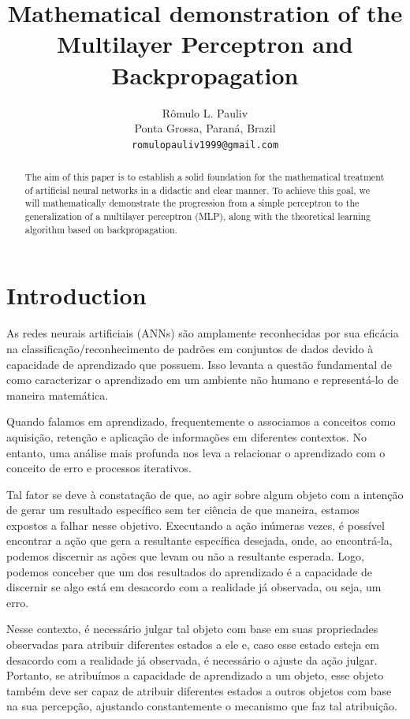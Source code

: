 \documentclass{article}
\title{Mathematical demonstration of the Multilayer Perceptron and Backpropagation}
\author{
 Rômulo L. Pauliv \\
  Ponta Grossa, Paraná, Brazil\\
  \texttt{romulopauliv1999@gmail.com} \\
}
\begin{document}
\maketitle
\begin{abstract}
  The aim of this paper is to establish a solid foundation for the mathematical treatment of artificial neural networks in a didactic and clear manner. To achieve this goal, we will mathematically demonstrate the progression from a simple perceptron to the generalization of a multilayer perceptron (MLP), along with the theoretical learning algorithm based on backpropagation.
\end{abstract}




\section{Introduction}
As redes neurais artificiais (ANNs) são amplamente reconhecidas por sua eficácia na classificação/reconhecimento de padrões em conjuntos de dados devido à capacidade de aprendizado que possuem. Isso levanta a questão fundamental de como caracterizar o aprendizado em um ambiente não humano e representá-lo de maneira matemática.

Quando falamos em aprendizado, frequentemente o associamos a conceitos como aquisição, retenção e aplicação de informações em diferentes contextos. No entanto, uma análise mais profunda nos leva a relacionar o aprendizado com o conceito de erro e processos iterativos. 

Tal fator se deve à constatação de que, ao agir sobre algum objeto com a intenção de gerar um resultado específico sem ter ciência de que maneira, estamos expostos a falhar nesse objetivo. Executando a ação inúmeras vezes, é possível encontrar a ação que gera a resultante específica desejada, onde, ao encontrá-la, podemos discernir as ações que levam ou não a resultante esperada. Logo, podemos conceber que um dos resultados do aprendizado é a capacidade de discernir se algo está em desacordo com a realidade já observada, ou seja, um erro. 

Nesse contexto, é necessário julgar tal objeto com base em suas propriedades observadas para atribuir diferentes estados a ele e, caso esse estado esteja em desacordo com a realidade já observada, é necessário o ajuste da ação julgar. Portanto, se atribuímos a capacidade de aprendizado a um objeto, esse objeto também deve ser capaz de atribuir diferentes estados a outros objetos com base na sua percepção, ajustando constantemente o mecanismo que faz tal atribuição. 
\end{document}
